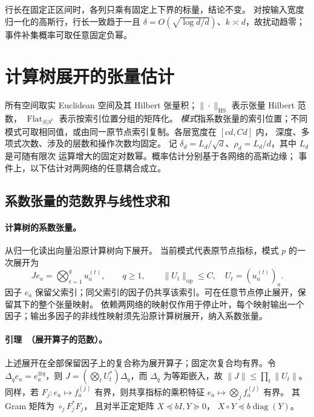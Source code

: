 \documentclass[a4paper]{tufte-handout}
\begin{document}
\begin{fullwidth}
行长在固定正区间时，各列只乘有固定上下界的标量，结论不变。
对按输入宽度归一化的高斯行，行长一致趋于一且
$\delta=O(\sqrt{\log d/d})$、$k\asymp d$，故扰动趋零；事件补集概率可取任意固定负幂。

\section{计算树展开的张量估计}
\label{fp:core-section}

所有空间取实 Euclidean 空间及其 Hilbert 张量积；$\|\cdot\|_{\mathrm{HS}}$ 表示张量 Hilbert 范数，
$\operatorname{Flat}_{S|S^c}$ 表示按索引位置分组的矩阵化。
\emph{模式}指系数张量的索引位置；不同模式可取相同值，或由同一原节点索引复制。各层宽度在 $[cd,Cd]$ 内，
深度、多项式次数、涉及的层数和操作次数均固定。
记 $\delta_d=L_d/\sqrt d$、$\rho_d=L_d/d$，其中 $L_d$ 是可随有限次
运算增大的固定对数幂。概率估计分别基于各网络的高斯边缘；
事件上，以下估计对两网络的任意耦合成立。

\subsection{系数张量的范数界与线性求和}
\label{fp:core-invariant-section}

\paragraph{计算树的系数张量。}
从归一化读出向量沿原计算树向下展开。
当前模式代表原节点指标，模式 $p$ 的一次展开为
\begin{equation}
 J e_a=\bigotimes_{t=1}^{q}u_a^{(t)},\qquad q\geq1,
 \qquad \|U_t\|_{\mathrm{op}}\leq C,
 \quad U_t=(u_a^{(t)})_a .
 \label{fp:core-replacement}
\end{equation}
因子 $e_a$ 保留父索引；同父索引的因子仍共享该索引。可在任意节点停止展开，保留其下的整个张量映射。
依赖两网络的映射仅作用于停止叶，每个映射输出一个因子；输出多因子的非线性映射须先沿原计算树展开，纳入系数张量。

\paragraph{引理~\thelemma（展开算子的范数）。}
上述展开在全部保留因子上的复合称为展开算子；固定次复合均有界。令
$\Delta_q e_a=e_a^{\otimes q}$，则
$J=(\bigotimes_tU_t^*)\Delta_q$，而 $\Delta_q$ 为等距嵌入，故
$\|J\|\leq\prod_t\|U_t\|$。
同样，若 $F_j:e_a\mapsto f_a^{(j)}$ 有界，则共享指标的乘积特征
$e_a\mapsto\bigotimes_jf_a^{(j)}$ 有界。
其 Gram 矩阵为 $\mathop{\circ}_jF_j^*F_j$，
且对半正定矩阵 $X\preceq bI,Y\succeq0$，
$X\circ Y\preceq b\operatorname{diag}(Y)$。


\end{fullwidth}
\end{document}

